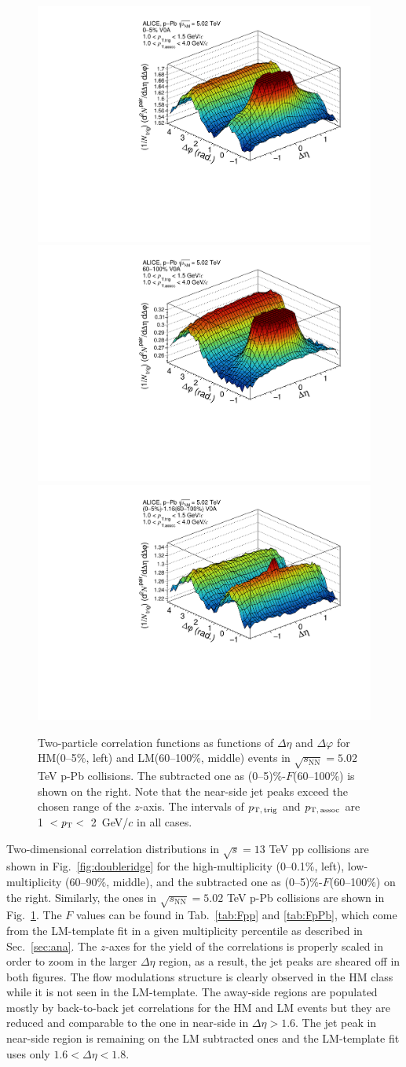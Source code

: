 \begin{figure}[h!]
			\includegraphics[width=0.3 \textwidth]{figures/corr_1_0_6.pdf}
			\includegraphics[width=0.3 \textwidth]{figures/corr_1_5_6.pdf}
			\includegraphics[width=0.3 \textwidth]{figures/corr_sub_temp_1_0_6.pdf}
\caption{Two-particle correlation functions as functions of $\Delta\eta$ and $\Delta\varphi$ for HM(0--5\%, left) and LM(60--100\%, middle) events in $\sqrt{s_{\mathrm{NN}}}=5.02$ TeV p-Pb collisions. The subtracted one as (0--5)\%-$F$(60--100\%) is shown on the right. Note that the near-side jet peaks exceed the chosen range of the $z$-axis. The intervals of $p_\mathrm{T,\,trig}$ and $p_\mathrm{T,\,assoc}$ are 1~$<\it{p}_{\rm{T}}<$~2~GeV/$c$ in all cases.}
\label{fig:doubleridgepPb}
\end{figure}

Two-dimensional correlation distributions in $\sqrt{s}=13$ TeV pp collisions are shown in Fig.~\ref{fig:doubleridge} for the high-multiplicity (0--0.1\%, left), low-multiplicity (60--90\%, middle), and the subtracted one as (0--5)\%-$F$(60--100\%) on the right. Similarly, the ones in $\sqrt{s_{\mathrm{NN}}}=5.02$ TeV p-Pb collisions are shown in Fig.~\ref{fig:doubleridgepPb}. The $F$ values can be found in Tab.~\ref{tab:Fpp} and \ref{tab:FpPb}, which come from the LM-template fit in a given multiplicity percentile as described in Sec.~\ref{sec:ana}. 
The $z$-axes for the yield of the correlations is properly scaled in order to zoom in the larger $\Delta\eta$ region, as a result, the jet peaks are sheared off in both figures. The flow modulations structure is clearly observed in the HM class while it is not seen in the LM-template. The away-side regions are populated mostly by back-to-back jet correlations for the HM and LM events but they are reduced and comparable to the one in near-side in $\Delta\eta > 1.6$. The jet peak in near-side region is remaining on the LM subtracted ones and the LM-template fit uses only $1.6< \Delta\eta < 1.8$.

